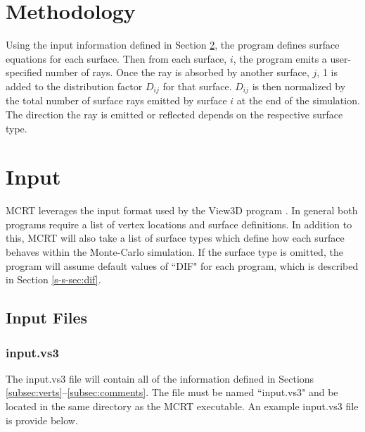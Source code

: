 \documentclass{article}
\begin{document}
\section{Methodology}
\label{sec:method}

Using the input information defined in Section \ref{sec:input}, the program defines surface equations for each surface. Then from each surface, $i$, the program emits a user-specified number of rays. Once the ray is absorbed by another surface, $j$, 1 is added to the distribution factor $D_{ij}$ for that surface. $D_{ij}$ is then normalized by the total number of surface rays emitted by surface $i$ at the end of the simulation. The direction the ray is emitted or reflected depends on the respective surface type.

\section{Input}
\label{sec:input}

MCRT leverages the input format used by the View3D program \citep{Walton2002}. In general both  programs require a list of vertex locations and surface definitions. In addition to this, MCRT will also take a list of surface types which define how each surface behaves within the Monte-Carlo simulation. If the surface type is omitted, the program will assume default values of ``DIF" for each program, which is described in Section \ref{s-s-sec:dif}.

\subsection{Input Files}

\subsubsection{input.vs3}

The input.vs3 file will contain all of the information defined in Sections \ref{subsec:verts}--\ref{subsec:comments}. The file must be named ``input.vs3" and be located in the same directory as the MCRT executable. An example input.vs3 file is provide below.
\end{document}
